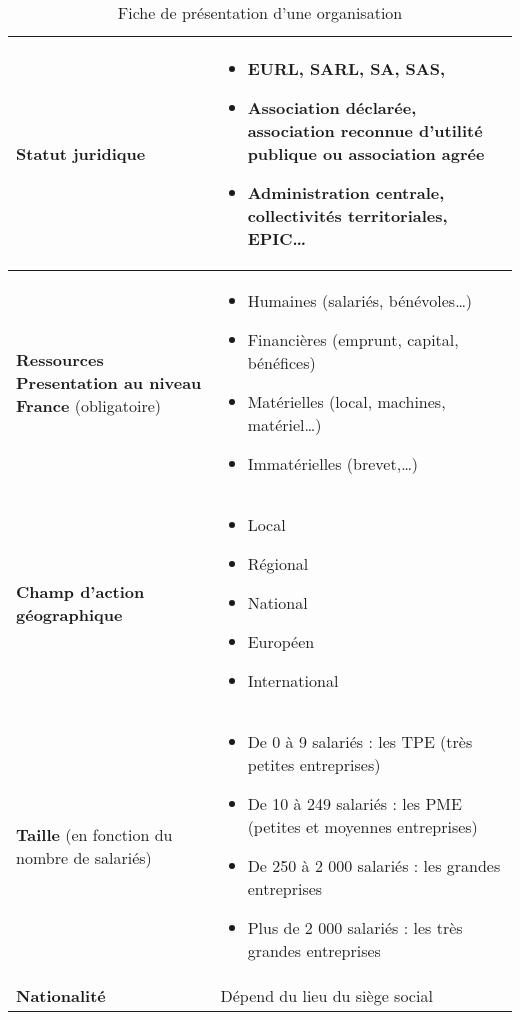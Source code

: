 \documentclass[stage1a]{tnreport} %
\begin{document}
\begin{table}
\begin{tabular}{|p{4cm}|p{13cm}|}
\textbf{Statut juridique} &
\begin{itemize}
 \item EURL,  SARL,  SA,  SAS, 
 \item Association déclarée, association reconnue d’utilité publique ou association agrée
 \item Administration centrale, collectivités territoriales, EPIC\ldots
\end{itemize} \\
\hline

\textbf{Ressources
Presentation au niveau France} (obligatoire) &
\begin{itemize}
 \item Humaines (salariés, bénévoles\ldots)
 \item Financières (emprunt, capital, bénéfices)
 \item Matérielles (local, machines, matériel\ldots)
 \item Immatérielles (brevet,\ldots)
\end{itemize} \\
\hline

\textbf{Champ d’action géographique} &
\begin{itemize}
 \item Local
 \item Régional
 \item National
 \item Européen 
 \item International
\end{itemize} \\
\hline

\textbf{Taille} (en fonction du nombre de salariés) &
\begin{itemize}
 \item De 0 à 9 salariés : les TPE (très petites entreprises)
 \item De 10 à 249 salariés : les PME (petites et moyennes entreprises)
 \item De 250 à 2 000 salariés : les grandes entreprises
 \item Plus de 2 000 salariés : les très grandes entreprises
\end{itemize} \\
\hline

\textbf{Nationalité} & Dépend du lieu du siège social \\

\hline
\end{tabular}
\caption{Fiche de présentation d’une organisation}\label{tab:fiche}
\end{table}
\end{document}
